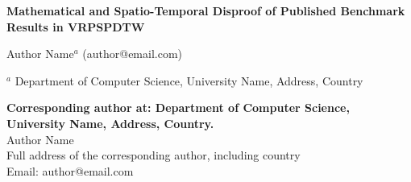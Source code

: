 \documentclass[review]{elsarticle}
\begin{document}
\hypersetup{pageanchor=false}
\begin{titlepage}
\begin{center}
\vspace*{1cm}

\textbf{\large Mathematical and Spatio-Temporal Disproof of Published Benchmark Results in VRPSPDTW}

\vspace{1.5cm}

Author Name$^a$ (author@email.com) \\

\hspace{10pt}

\begin{flushleft}
\small  
$^a$ Department of Computer Science, University Name, Address, Country

\vspace{1cm}
\textbf{Corresponding author at: Department of Computer Science, University Name, Address, Country.} \\
Author Name \\
Full address of the corresponding author, including country \\
Email: author@email.com

\end{flushleft}        
\end{center}
\end{titlepage}
\hypersetup{pageanchor=true}
\end{document}
